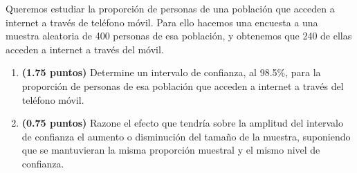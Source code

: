 
Queremos estudiar la proporción de personas de una población que acceden a internet a través de teléfono móvil. Para ello hacemos una encuesta a una muestra aleatoria de 400 personas de esa población, y obtenemos que 240 de ellas acceden a internet a través del móvil.
\begin{enumerate}[label=\alph*)]
\item \textbf{(1.75 puntos)} Determine un intervalo de confianza, al 98.5\%, para la proporción de personas de esa población que acceden a internet a través del teléfono móvil.
\item \textbf{(0.75 puntos)} Razone el efecto que tendría sobre la amplitud del intervalo de confianza el aumento o disminución del tamaño de la muestra, suponiendo que se mantuvieran la misma proporción muestral y el mismo nivel de confianza.
\end{enumerate}
